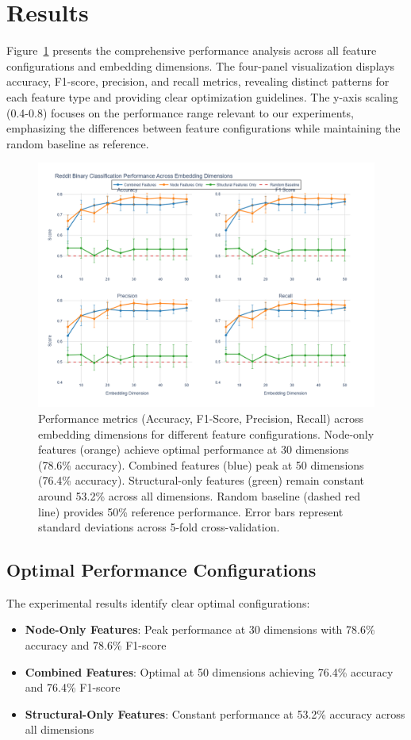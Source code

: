 \documentclass[linenumbers]{aastex701}
\begin{document}
\section{Results} \label{sec:results}

Figure~\ref{fig:performance_metrics} presents the comprehensive performance analysis across all feature configurations and embedding dimensions. The four-panel visualization displays accuracy, F1-score, precision, and recall metrics, revealing distinct patterns for each feature type and providing clear optimization guidelines. The y-axis scaling (0.4-0.8) focuses on the performance range relevant to our experiments, emphasizing the differences between feature configurations while maintaining the random baseline as reference.

\begin{figure}[htbp]
\centering
\includegraphics[width=\textwidth]{performance_metrics.png}
\caption{Performance metrics (Accuracy, F1-Score, Precision, Recall) across embedding dimensions for different feature configurations. Node-only features (orange) achieve optimal performance at 30 dimensions (78.6\% accuracy). Combined features (blue) peak at 50 dimensions (76.4\% accuracy). Structural-only features (green) remain constant around 53.2\% across all dimensions. Random baseline (dashed red line) provides 50\% reference performance. Error bars represent standard deviations across 5-fold cross-validation.}
\label{fig:performance_metrics}
\end{figure}

\subsection{Optimal Performance Configurations}
The experimental results identify clear optimal configurations:
\begin{itemize}
\item \textbf{Node-Only Features}: Peak performance at 30 dimensions with 78.6\% accuracy and 78.6\% F1-score
\item \textbf{Combined Features}: Optimal at 50 dimensions achieving 76.4\% accuracy and 76.4\% F1-score  
\item \textbf{Structural-Only Features}: Constant performance at 53.2\% accuracy across all dimensions
\end{itemize}
\end{document}
